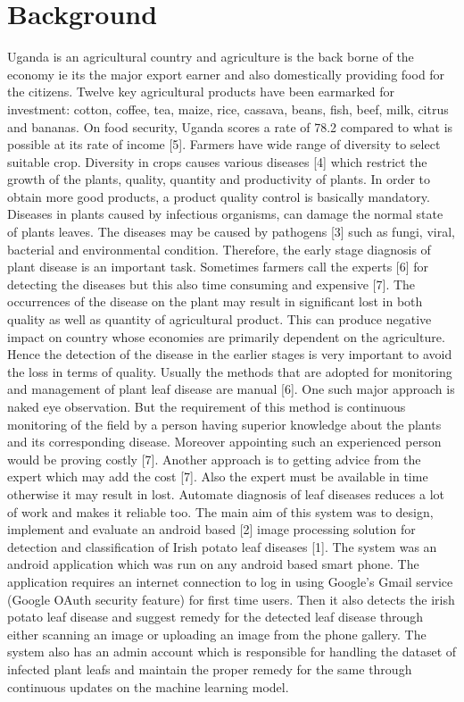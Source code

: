 \documentclass[11pt]{report}
\begin{document}
\section{Background}
Uganda is an agricultural country and agriculture is the back borne of the economy ie its the major export earner and also domestically providing food for the citizens.
Twelve key agricultural products have been earmarked for investment: cotton, coffee, tea, maize, rice, cassava, beans, fish, beef, milk, citrus and bananas. On food security, Uganda scores a rate of 78.2 compared to what is possible at its rate of income [5]. Farmers have wide range of diversity to select suitable crop. Diversity in crops causes various diseases [4] which restrict the growth of the plants, quality, quantity and
productivity of plants. In order to obtain more good products, a product quality control is basically mandatory. Diseases in plants caused by infectious organisms, can damage the normal state of plants leaves. The diseases may be caused by pathogens [3] such as fungi, viral, bacterial and environmental condition. Therefore, the early stage diagnosis of plant disease is an important task. Sometimes farmers call the experts [6] for detecting the diseases but this also time consuming and expensive [7]. The occurrences of the disease on the plant may result in significant lost in both quality as well as quantity of agricultural product. This can produce negative impact on country whose economies are primarily dependent on the agriculture. Hence the detection of the disease in the earlier stages is very important to avoid the loss in terms of quality.
Usually the methods that are adopted for monitoring and management of plant leaf disease are manual [6]. One such major approach is naked eye observation. But the requirement of this method is continuous monitoring of the field by a person having superior knowledge about the plants and its corresponding disease. Moreover appointing such an experienced person would be proving costly [7]. Another approach is to getting advice from the expert which may add the cost [7]. Also the expert must be available in time otherwise it may result in lost. Automate diagnosis of leaf diseases reduces a lot of work and makes it reliable too. The main aim of this system was to design, implement and evaluate an android based [2] image processing solution for detection and classification of Irish potato leaf diseases [1]. The system was an android application which was run on any android based smart phone. The application requires an internet connection to log in using Google's Gmail service (Google OAuth security feature) for first time users. Then it also detects the irish potato leaf disease and
suggest remedy for the detected leaf disease through either scanning an image or uploading an image from the phone gallery. The system also has an admin account which is responsible for handling the dataset of infected plant leafs and maintain the proper remedy for the same through continuous updates on the machine learning model.\\
\end{document}
